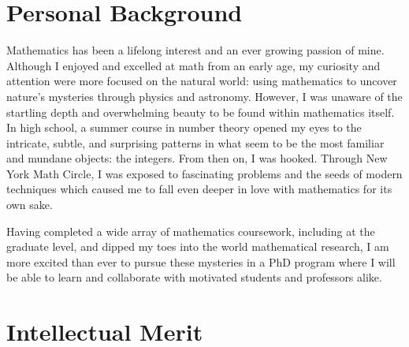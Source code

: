 \documentclass[11pt]{amsart}
\begin{document}
\thispagestyle{fancy}

\section*{Personal Background}

\par 
Mathematics has been a lifelong interest and an ever growing passion of mine. Although I enjoyed and excelled at math from an early age, my curiosity and attention were more focused on the natural world: using mathematics to uncover nature's mysteries through physics and astronomy. However, I was unaware of the startling depth and overwhelming beauty to be found within mathematics itself. In high school, a summer course in number theory opened my eyes to the intricate, subtle, and surprising patterns in what seem to be the most familiar and mundane objects: the integers. From then on, I was hooked. Through New York Math Circle, I was exposed to fascinating problems and the seeds of modern techniques which caused me to fall even deeper in love with mathematics for its own sake. 
\par
Having completed a wide array of mathematics coursework, including at the graduate level, and dipped my toes into the world mathematical research, I am more excited than ever to pursue these mysteries in a PhD program where I will be able to learn and collaborate with motivated students and professors alike. 


\section*{Intellectual Merit}
\end{document}
